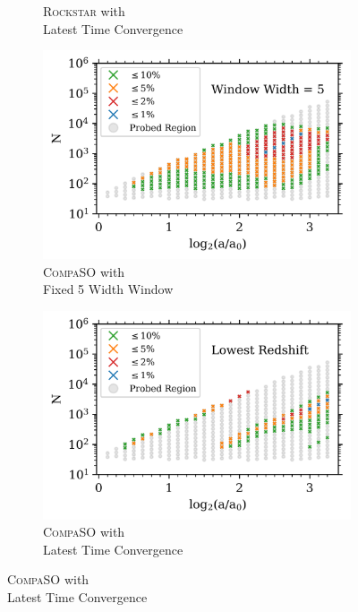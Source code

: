 \begin{figure}
\begin{subfigure}{.49\textwidth}
\caption{\textsc{Rockstar} with\\ Latest Time Convergence}
\end{subfigure}
\begin{subfigure}{.49\textwidth}
\centering
\includegraphics[width=\textwidth]{Ch3_Self_Sim/Appendix_Plots_gtr20/CompaSO_n15_mean_past_joyce_mah_M200c_gtr20_FW_WW5_N_vs_a_convergence_MT2_UVM_with_text_min_1000.png}
\caption{\textsc{CompaSO} with\\ Fixed 5 Width Window}
\end{subfigure}
\begin{subfigure}{.49\textwidth}
\centering
\includegraphics[width=\textwidth]{Ch3_Self_Sim/Appendix_Plots_gtr20/CompaSO_n15_mean_past_joyce_mah_M200c_gtr20_LZ_N_vs_a_convergence_with_text_min_1000.png}
\caption{\textsc{CompaSO} with\\ Latest Time Convergence}
\end{subfigure}
\end{figure}
